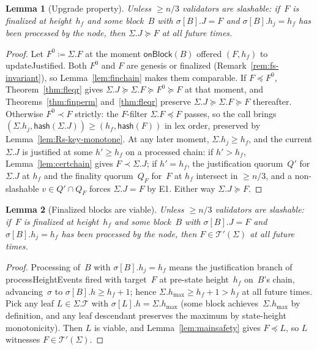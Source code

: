 \ifx\litemode\undefined\documentclass{article}\fi
\newcommand{\T}[0]{\ensuremath{\mathcal{T}}}
\newcommand{\hash}{\mathsf{hash}}
\newcommand{\hmax}{\ensuremath{h_{\max}}\xspace}
\newcommand{\viableTree}{\ensuremath{\mathcal{T}'}}
\newcommand{\processHeightEvents}{\textsf{processHeightEvents}\xspace}
\newcommand{\onBlock}{\textsf{onBlock}\xspace}
\newcommand{\updateJustified}{\textsf{updateJustified}\xspace}
\theoremstyle{plain}
\newtheorem{lemma}{Lemma}
\theoremstyle{definition}
\theoremstyle{remark}
\begin{document}
\begin{lemma}[Upgrade property]\label{lem:upgrade}
Unless $\geq n/3$ validators are slashable: if~$F$ is finalized at height~$h_f$ and some block~$B$ with $\sigma[B].J = F$ and $\sigma[B].h_j = h_f$ has been processed by the node, then $\Sigma.J \succeq F$ at all future times.
\end{lemma}

\begin{proof}
Let $F^0 \coloneqq \Sigma.F$ at the moment $\onBlock(B)$ offered $(F, h_f)$ to \updateJustified.
Both $F^0$ and $F$ are genesis or finalized (Remark~\ref{rem:fs-invariant}), so Lemma~\ref{lem:finchain} makes them comparable.
If $F \preceq F^0$, Theorem~\ref{thm:fleqr} gives $\Sigma.J \succeq \Sigma.F \succeq F^0 \succeq F$ at that moment, and Theorems~\ref{thm:finperm} and~\ref{thm:fleqr} preserve $\Sigma.J \succeq \Sigma.F \succeq F$ thereafter.
Otherwise $F^0 \prec F$ strictly: the $F$-filter $\Sigma.F \preceq F$ passes, so the call brings $(\Sigma.h_j, \hash(\Sigma.J)) \geq (h_f, \hash(F))$ in lex order, preserved by Lemma~\ref{lem:Rs-key-monotone}.
At any later moment, $\Sigma.h_j \geq h_f$, and the current $\Sigma.J$ is justified at some $h' \geq h_f$ on a processed chain: if $h' > h_f$, Lemma~\ref{lem:certchain} gives $F \prec \Sigma.J$; if $h' = h_f$, the justification quorum~$Q'$ for $\Sigma.J$ at $h_f$ and the finality quorum~$Q_F$ for~$F$ at $h_f$ intersect in $\geq n/3$, and a non-slashable $v \in Q' \cap Q_F$ forces $\Sigma.J = F$ by E1.
Either way $\Sigma.J \succeq F$.
\end{proof}

\begin{lemma}[Finalized blocks are viable]\label{lem:viable-finalized}
Unless $\geq n/3$ validators are slashable: if~$F$ is finalized at height~$h_f$ and some block~$B$ with $\sigma[B].J = F$ and $\sigma[B].h_j = h_f$ has been processed by the node, then $F \in \viableTree(\Sigma)$ at all future times.
\end{lemma}

\begin{proof}
Processing of~$B$ with $\sigma[B].h_j = h_f$ means the justification branch of \processHeightEvents fired with target~$F$ at pre-state height~$h_f$ on~$B$'s chain, advancing~$\sigma$ to $\sigma[B].h \geq h_f + 1$; hence $\Sigma.\hmax \geq h_f + 1 > h_f$ at all future times.
Pick any leaf $L \in \Sigma.\T$ with $\sigma[L].h = \Sigma.\hmax$ (some block achieves~$\Sigma.\hmax$ by definition, and any leaf descendant preserves the maximum by state-height monotonicity).
Then $L$ is viable, and Lemma~\ref{lem:mainsafety} gives $F \preceq L$, so $L$ witnesses $F \in \viableTree(\Sigma)$.
\end{proof}
\end{document}
